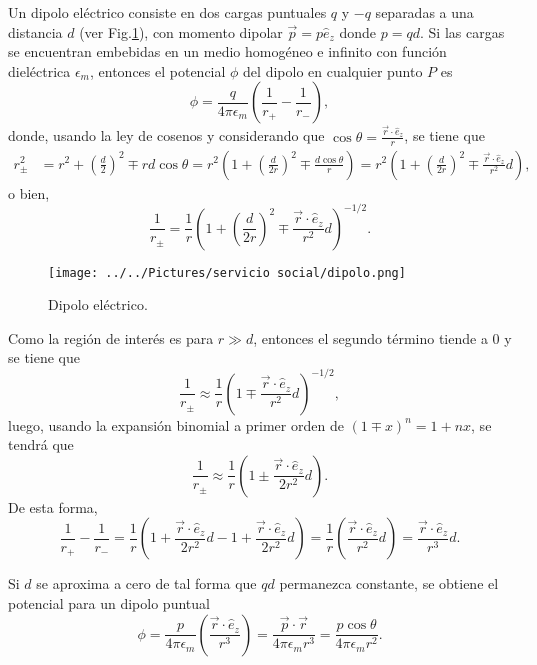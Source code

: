 \documentclass[paper=letter, fontsize=12pt,]{article}
\begin{document}
Un dipolo eléctrico consiste en dos cargas puntuales $q$ y $-q$ separadas a una distancia $d$ (ver Fig.\ref{dipolo_elec}), con momento dipolar $\Vec{p}=p\hat{e}_z$ donde $p=qd$. Si las cargas se encuentran embebidas en un medio homogéneo e infinito con función dieléctrica $\epsilon_m$, entonces el potencial $\phi$ del dipolo en cualquier punto $P$ es \cite{Bohren,Griffiths}
\begin{equation}
    \phi=\frac{q}{4\pi\epsilon_m}\left(\frac{1}{r_+}-\frac{1}{r_{-}}\right),    
\end{equation}
donde, usando la ley de cosenos y considerando que $\cos\theta=\frac{\Vec{r}\cdot\hat{e}_z}{r}$, se tiene que 
\begin{align*}
    r_{\pm}^2&=r^2+\left(\frac{d}{2}\right)^2 \mp rd\cos\theta=r^2\left(1+\left(\frac{d}{2r}\right)^2\mp \frac{d\cos\theta}{r}\right)=r^2\left(1+\left(\frac{d}{2r}\right)^2\mp \frac{\Vec{r}\cdot\hat{e}_z}{r^2}d\right),
\end{align*}
o bien,
\begin{equation*}
  \frac{1}{r_{\pm}}=\frac{1}{r}\left(1+\left(\frac{d}{2r}\right)^2\mp \frac{\Vec{r}\cdot\hat{e}_z}{r^2}d\right)^{-1/2}.  
\end{equation*}
\begin{figure}
    \centering
    \texttt{[image: ../../Pictures/servicio social/dipolo.png]} 
    \caption{Dipolo eléctrico.}
    \label{dipolo_elec}
\end{figure}
Como la región de interés es para $r\gg d$, entonces el segundo término tiende a 0 y se tiene que
\begin{equation*}
    \frac{1}{r_{\pm}}\approx\frac{1}{r}\left(1\mp \frac{\Vec{r}\cdot\hat{e}_z}{r^2}d\right)^{-1/2},
\end{equation*}
luego, usando la expansión binomial a primer orden de $(1\mp x)^n=1+nx$,  se tendrá que
\begin{equation*}
    \frac{1}{r_{\pm}}\approx\frac{1}{r}\left(1\pm \frac{\Vec{r}\cdot\hat{e}_z}{2r^2}d\right).
\end{equation*}
De esta forma,
\begin{equation}
    \frac{1}{r_+}-\frac{1}{r_{-}}=\frac{1}{r}\left(1+ \frac{\Vec{r}\cdot\hat{e}_z}{2r^2}d-1+ \frac{\Vec{r}\cdot\hat{e}_z}{2r^2}d\right)=\frac{1}{r}\left( \frac{\Vec{r}\cdot\hat{e}_z}{r^2}d\right)=\frac{\Vec{r}\cdot\hat{e}_z}{r^3}d.    
\end{equation}

Si $d$ se aproxima a cero de tal forma que $qd$ permanezca constante, se obtiene el potencial para un dipolo puntual
\begin{equation}
\phi=\frac{p}{4\pi\epsilon_m}\left(\frac{\Vec{r}\cdot\hat{e}_z}{r^3}\right)=\frac{\Vec{p}\cdot\Vec{r}}{4\pi\epsilon_m r^3}=\frac{p\cos\theta}{4\pi\epsilon_m r^2}.
\label{pot_dipolo}
\end{equation}
\end{document}

